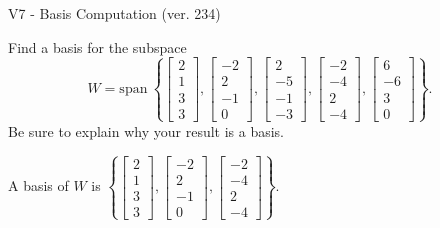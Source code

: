 \begin{exercise}
  \begin{exerciseTitle}V7 - Basis Computation (ver. 234)\end{exerciseTitle}
  \begin{exerciseStatement}
    Find a basis for the subspace 
\[W=\mathrm{span}\ \left\{\left[\begin{array}{r}
2 \\
1 \\
3 \\
3
\end{array}\right] , \left[\begin{array}{r}
-2 \\
2 \\
-1 \\
0
\end{array}\right] , \left[\begin{array}{r}
2 \\
-5 \\
-1 \\
-3
\end{array}\right] , \left[\begin{array}{r}
-2 \\
-4 \\
2 \\
-4
\end{array}\right] , \left[\begin{array}{r}
6 \\
-6 \\
3 \\
0
\end{array}\right]\right\}.\]
 Be sure to explain why your result is a basis.


  \end{exerciseStatement}
  \begin{exerciseAnswer}
   A basis of \(W\) is  \(\left\{\left[\begin{array}{r}
2 \\
1 \\
3 \\
3
\end{array}\right] , \left[\begin{array}{r}
-2 \\
2 \\
-1 \\
0
\end{array}\right] , \left[\begin{array}{r}
-2 \\
-4 \\
2 \\
-4
\end{array}\right]\right\}\).
  


  \end{exerciseAnswer}
\end{exercise}